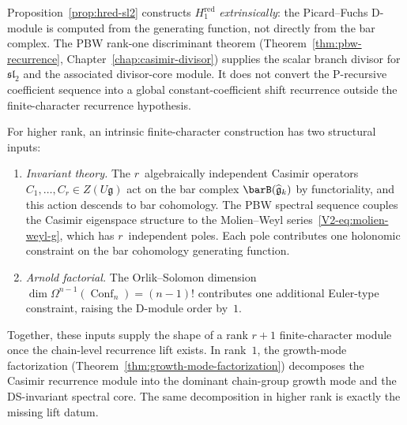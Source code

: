 \begin{remark}
\label{rem:hred-intrinsic}
Proposition~\ref{prop:hred-sl2} constructs $H^{\mathrm{red}}_1$
\emph{extrinsically}: the Picard--Fuchs D-module is computed from
the generating function, not directly from the bar complex.
The PBW rank-one discriminant theorem
(Theorem~\ref{thm:pbw-recurrence},
Chapter~\ref{chap:casimir-divisor}) supplies the scalar branch
divisor for $\mathfrak{sl}_2$ and the associated divisor-core
module. It does not convert the P-recursive coefficient sequence into
a global constant-coefficient shift recurrence outside the
finite-character recurrence hypothesis.

For higher rank, an intrinsic finite-character construction has two
structural inputs:
\begin{enumerate}[label=\textup{(\Roman*)}]
\item \emph{Invariant theory.}
The $r$~algebraically independent Casimir operators
$C_1,\ldots,C_r\in Z(U\mathfrak{g})$ act on the bar complex
$\barB(\widehat{\mathfrak{g}}_k)$ by functoriality, and this
action descends to bar cohomology. The PBW spectral sequence
couples the Casimir eigenspace structure to the Molien--Weyl
series~\eqref{V2-eq:molien-weyl-g}, which has $r$~independent
poles. Each pole contributes one holonomic constraint on
the bar cohomology generating function.
\item \emph{Arnold factorial.}
The Orlik--Solomon dimension
$\dim\Omega^{n-1}(\operatorname{Conf}_n)=(n{-}1)!$ contributes
one additional Euler-type constraint, raising the D-module
order by~$1$.
\end{enumerate}
Together, these inputs supply the shape of a rank $r{+}1$
finite-character module once the chain-level recurrence lift exists.
In rank~$1$, the growth-mode factorization
\textup{(}Theorem~\ref{thm:growth-mode-factorization}\textup{)}
decomposes the Casimir recurrence module into the dominant
chain-group growth mode and the DS-invariant spectral core. The same
decomposition in higher rank is exactly the missing lift datum.
\end{remark}

